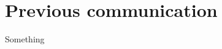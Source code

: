 \chapter{Previous communication}\label{cha:prev_communication} 


Something 








%

%

%

%

%

%

%

